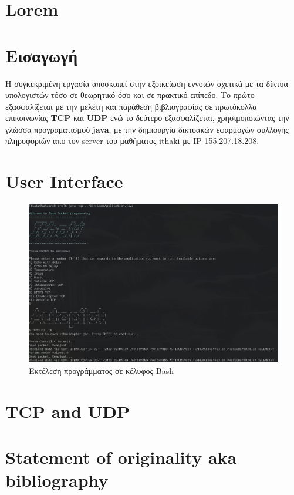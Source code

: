 \documentclass[12pt, a4paper]{article}
\begin{document}



\pagebreak
\tableofcontents{}
\pagebreak

\section{Lorem}
\lipsum


\section{Εισαγωγή}

Η συγκεκριμένη εργασία αποσκοπεί στην εξοικείωση εννοιών σχετικά με τα δίκτυα υπολογιστών τόσο σε θεωρητικό όσο και σε πρακτικό επίπεδο. Το πρώτο εξασφαλίζεται με την μελέτη και παράθεση βιβλιογραφίας σε πρωτόκολλα επικοινωνίας \textbf{TCP} και \textbf{UDP} ενώ το δεύτερο εξασφαλίζεται, χρησιμοποιώντας την γλώσσα προγραματισμού \textbf{java}, με την δημιουργία δικτυακών εφαρμογών συλλογής πληροφοριών απο τον server του μαθήματος ithaki με IP 155.207.18.208.

\section{User Interface}

\begin{figure}[h!]
\centering
	\includegraphics[width=\textwidth]{assets/ui.png}
	\caption{Εκτέλεση προγράμματος σε κέλυφος Bash} 
    \label{fig:ui}
\end{figure}

\section{TCP and UDP}


\section{Statement of originality aka bibliography}
 
\end{document}
